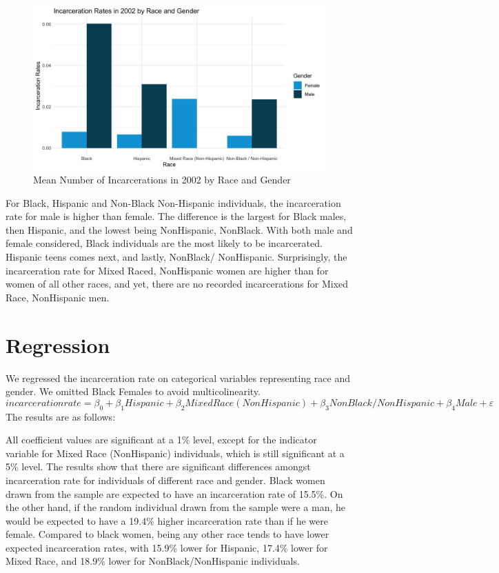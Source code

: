 \documentclass{article}
\begin{document}
\begin{figure}[H]
    \begin{center}
        \includegraphics[width=.85\textwidth]{incarcerations_by_racegender.png}
    \end{center}
    \caption{Mean Number of Incarcerations in 2002 by Race and Gender}
    \label{fig:graph}
\end{figure}

For Black, Hispanic and Non-Black Non-Hispanic individuals, the incarceration rate for male is higher than female. The difference is the largest for Black males, then Hispanic, and the lowest being NonHispanic, NonBlack. 
With both male and female considered, Black individuals are the most likely to be incarcerated. Hispanic teens comes next, and lastly, NonBlack/ NonHispanic. Surprisingly, the incarceration rate for Mixed Raced, NonHispanic women
are higher than for women of all other races, and yet, there are no recorded incarcerations for Mixed Race, NonHispanic men. 

\section{Regression}

We regressed the incarceration rate on categorical variables representing race and gender. We omitted Black Females to avoid multicolinearity. 
$$
incarceration rate = \beta_{0} + \beta_{1}Hispanic + \beta_{2}Mixed Race (NonHispanic) + \beta_{3} NonBlack/ NonHispanic + \beta_{4} Male + \varepsilon
$$
The results are as follows: 



\newpage
All coefficient values are significant at a 1\% level, except for the indicator variable for Mixed Race (NonHispanic) individuals, which is still significant at a 5\% level. The results show that there are significant differences amongst incarceration rate for individuals of different race and gender. Black women drawn from the sample are expected to have an incarceration rate of 15.5\%. On the other hand, if the random individual drawn from the sample were a man, he would be expected to have a 19.4\% higher incarceration rate than if he were female. Compared to black women, being any other race tends to have lower expected incarceration rates, with 15.9\% lower for Hispanic, 17.4\% lower for Mixed Race, and 18.9\% lower for NonBlack/NonHispanic individuals.
\end{document}
